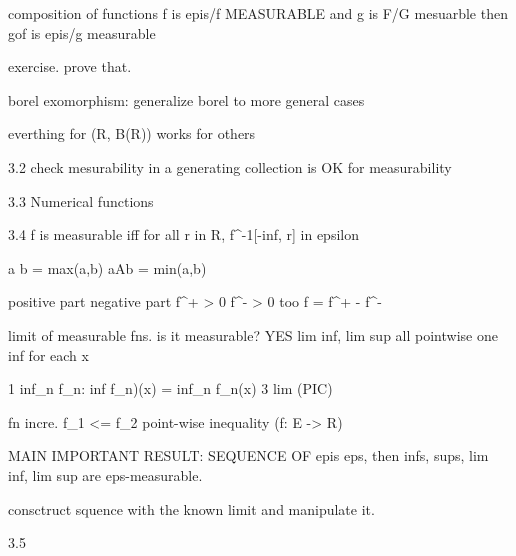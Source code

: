 composition of functions
f is epis/f MEASURABLE and g is F/G mesuarble
then gof is epis/g measurable

exercise. prove that.

borel exomorphism:
generalize borel to more general cases

everthing for
(R, B(R))
works for
others

3.2 check mesurability in a generating collection is OK for measurability

3.3 Numerical functions

3.4 f is \epsilon measurable iff for all r in R, f^-1[-inf, r] in epsilon

 a \vii b = max(a,b)
 aAb = min(a,b)
 
positive part
negative part
f^+ >  0
f^- > 0 too
f = f^+  -  f^-

limit of measurable fns. is it measurable? YES
lim inf, lim sup
all pointwise
one inf for each x

1 inf_n f_n: inf f_n)(x) = inf_n f_n(x)
3 lim
(PIC)


fn incre. f_1 <= f_2   point-wise inequality
(f: E -> R)


MAIN IMPORTANT RESULT:
SEQUENCE OF epis eps, then infs, sups, lim inf, lim sup are eps-measurable.


consctruct squence with the known limit and manipulate it.

3.5


